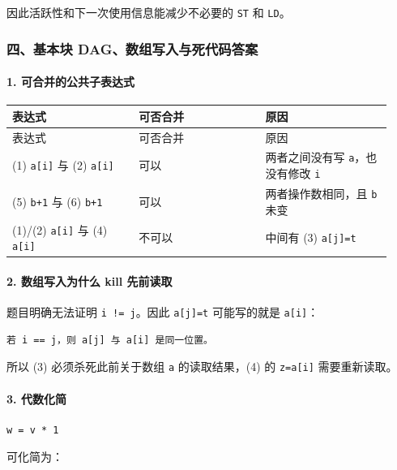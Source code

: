 \documentclass[UTF8]{ctexart}
\begin{document}
因此活跃性和下一次使用信息能减少不必要的 \texttt{ST} 和 \texttt{LD}。

\subsubsection*{四、基本块 DAG、数组写入与死代码答案}

\paragraph*{1. 可合并的公共子表达式}

\begin{longtable}{|p{0.31\linewidth}|p{0.31\linewidth}|p{0.31\linewidth}|}
\hline
表达式 & 可否合并 & 原因 \\
\hline
\endfirsthead
表达式 & 可否合并 & 原因 \\
\hline
\endhead
(1) \texttt{a[i]} 与 (2) \texttt{a[i]} & 可以 & 两者之间没有写 \texttt{a}，也没有修改 \texttt{i} \\
\hline
(5) \texttt{b+1} 与 (6) \texttt{b+1} & 可以 & 两者操作数相同，且 \texttt{b} 未变 \\
\hline
(1)/(2) \texttt{a[i]} 与 (4) \texttt{a[i]} & 不可以 & 中间有 (3) \texttt{a[j]=t} \\
\hline
\end{longtable}

\paragraph*{2. 数组写入为什么 kill 先前读取}

题目明确无法证明 \texttt{i != j}。因此 \texttt{a[j]=t} 可能写的就是 \texttt{a[i]}：

\begin{Verbatim}[fontsize=\small,breaklines=true]
若 i == j，则 a[j] 与 a[i] 是同一位置。
\end{Verbatim}

所以 (3) 必须杀死此前关于数组 \texttt{a} 的读取结果，(4) 的 \texttt{z=a[i]} 需要重新读取。

\paragraph*{3. 代数化简}

\begin{Verbatim}[fontsize=\small,breaklines=true]
w = v * 1
\end{Verbatim}

可化简为：
\end{document}
